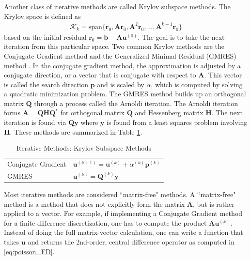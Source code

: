 Another class of iterative methods are called Krylov subspace methods. The Krylov space is defined as
\begin{align}
\mathcal{K}_k = \text{span} \{ \textbf{r}_0, \textbf{A} \textbf{r}_0, \textbf{A}^2 \textbf{r}_0, ..., \textbf{A}^{k-1} \textbf{r}_0 \}
\end{align}
based on the initial residual $\textbf{r}_0 = \textbf{b} - \textbf{A} \textbf{u}^{(0)}$. The goal is to take the next iteration from this particular space. Two common Krylov methods are the Conjugate Gradient method \citep{hestenes1952methods} and the Generalized Minimal Residual (GMRES) method \citep{saad1986gmres}. In the conjugate gradient method, the approximation is adjusted by a conjugate direction, or a vector that is conjugate with respect to $\textbf{A}$. This vector is called the search direction $\textbf{p}$ and is scaled by $\alpha$, which is computed by solving a quadratic minimization problem. The GMRES method builds up an orthogonal matrix $\textbf{Q}$ through a process called the Arnoldi iteration. The Arnoldi iteration forms $\textbf{A} = \textbf{Q} \textbf{H} \textbf{Q}^*$ for orthogonal matrix $\textbf{Q}$ and Hessenberg matrix $\textbf{H}$. The next iteration is found via $\textbf{Q} \textbf{y}$ where $\textbf{y}$ is found from a least squares problem involving $\textbf{H}$. These methods are summarized in Table \ref{tab:ksm}.

\begin{table}[h!]
    \centering
    \begin{tabular}{ | l | l |}
        \hline
        Conjugate Gradient & $\textbf{u}^{(k+1)} = \textbf{u}^{(k)} + \alpha^{(k)} \textbf{p}^{(k)}$ \\
        GMRES & $\textbf{u}^{(k)} = \textbf{Q}^{(k)} \textbf{y}$ \\
        \hline
    \end{tabular}
    \caption{Iterative Methods: Krylov Subspace Methods}
    \label{tab:ksm}
\end{table}

Most iterative methods are considered ``matrix-free" methods. A ``matrix-free" method is a method that does not explicitly form the matrix $\textbf{A}$, but is rather applied to a vector. For example, if implementing a Conjugate Gradient method for a finite difference discretization, one has to compute the product $\textbf{A} \textbf{u}^{(k)}$. Instead of doing the full matrix-vector calculation, one can write a function that takes $\textbf{u}$ and returns the 2nd-order, central difference operator as computed in \ref{eq:poisson_FD}.

